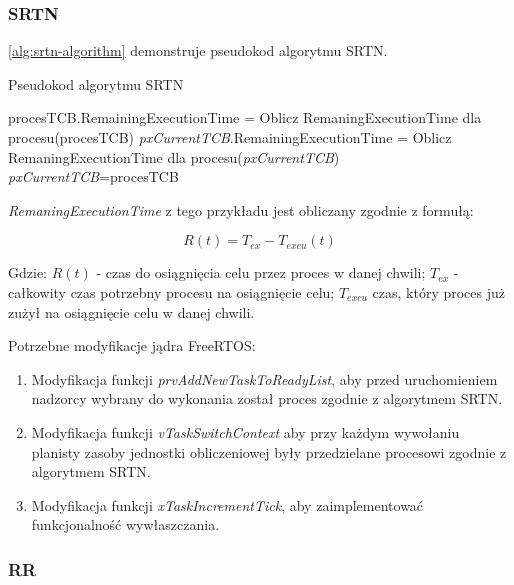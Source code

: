 \documentclass[../../main]{subfiles}
\begin{document}
\subsubsection{SRTN}

\cref{alg:srtn-algorithm} demonstruje pseudokod algorytmu SRTN.

\begin{algorithm}
\caption{Pseudokod algorytmu SRTN}\label{alg:srtn-algorithm}
\begin{algorithmic}[1]
    \State procesTCB.RemainingExecutionTime = Oblicz RemaningExecutionTime dla procesu(procesTCB)
    \State \textit{pxCurrentTCB}.RemainingExecutionTime = Oblicz RemaningExecutionTime dla procesu(\textit{pxCurrentTCB})
        \State \textit{pxCurrentTCB}=procesTCB
    \EndIf
\EndFor
\end{algorithmic}
\end{algorithm}

\textit{RemaningExecutionTime} z tego przykładu jest obliczany zgodnie z formułą:

\large
\begin{equation}
    R(t)=T_{ex}-T_{excu}(t)
    \label{eq:remaining-time}
\end{equation}
\normalsize

Gdzie: $R(t)$ - czas do osiągnięcia celu przez proces w danej chwili; $T_{ex}$ - całkowity czas potrzebny procesu na osiągnięcie celu; $T_{excu}$ czas, który  proces już zużył na osiągnięcie celu w danej chwili.

Potrzebne modyfikacje jądra FreeRTOS:

\begin{enumerate}
    \item Modyfikacja funkcji \textit{prvAddNewTaskToReadyList}, aby przed uruchomieniem nadzorcy wybrany do wykonania został proces zgodnie z algorytmem SRTN.
    \item Modyfikacja funkcji \textit{vTaskSwitchContext} aby przy każdym wywołaniu planisty zasoby jednostki obliczeniowej były przedzielane procesowi zgodnie z algorytmem SRTN.
    \item Modyfikacja funkcji \textit{xTaskIncrementTick}, aby zaimplementować funkcjonalność wywłaszczania.
\end{enumerate}

\subsubsection{RR}
\end{document}
